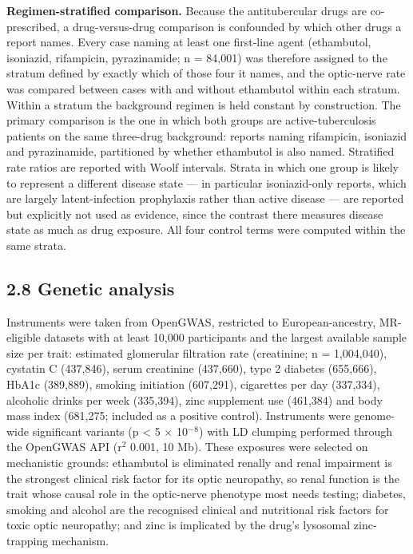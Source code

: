 \documentclass[utf8]{FrontiersinVancouver}
\begin{document}
\textbf{Regimen-stratified comparison.} Because the antitubercular drugs are co-prescribed, a drug-versus-drug comparison is confounded by which other drugs a report names. Every case naming at least one first-line agent (ethambutol, isoniazid, rifampicin, pyrazinamide; n = 84,001) was therefore assigned to the stratum defined by exactly which of those four it names, and the optic-nerve rate was compared between cases with and without ethambutol within each stratum. Within a stratum the background regimen is held constant by construction. The primary comparison is the one in which both groups are active-tuberculosis patients on the same three-drug background: reports naming rifampicin, isoniazid and pyrazinamide, partitioned by whether ethambutol is also named. Stratified rate ratios are reported with Woolf intervals. Strata in which one group is likely to represent a different disease state --- in particular isoniazid-only reports, which are largely latent-infection prophylaxis rather than active disease --- are reported but explicitly not used as evidence, since the contrast there measures disease state as much as drug exposure. All four control terms were computed within the same strata.

\subsection{2.8 Genetic analysis}

Instruments were taken from OpenGWAS, restricted to European-ancestry, MR-eligible datasets with at least 10,000 participants and the largest available sample size per trait: estimated glomerular filtration rate (creatinine; n = 1,004,040), cystatin C (437,846), serum creatinine (437,660), type 2 diabetes (655,666), HbA1c (389,889), smoking initiation (607,291), cigarettes per day (337,334), alcoholic drinks per week (335,394), zinc supplement use (461,384) and body mass index (681,275; included as a positive control). Instruments were genome-wide significant variants (p < 5 $\times$ 10$^{-}$$^{8}$) with LD clumping performed through the OpenGWAS API (r$^{2}$ 0.001, 10 Mb). These exposures were selected on mechanistic grounds: ethambutol is eliminated renally and renal impairment is the strongest clinical risk factor for its optic neuropathy, so renal function is the trait whose causal role in the optic-nerve phenotype most needs testing; diabetes, smoking and alcohol are the recognised clinical and nutritional risk factors for toxic optic neuropathy; and zinc is implicated by the drug's lysosomal zinc-trapping mechanism.
\end{document}
